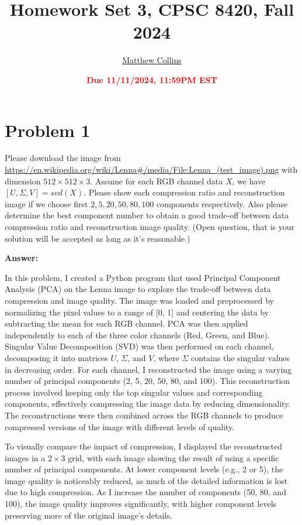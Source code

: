 \documentclass[11pt]{article}
\title{{\bf Homework Set 3, CPSC 8420, Fall 2024}} %
\author{\Large\underline{Matthew Collins}}
\date{\textbf{\Large\textcolor{red}{Due 11/11/2024, 11:59PM EST}}} %
\begin{document}
	\maketitle
	

\section*{Problem 1}
Please download the image from \url{https://en.wikipedia.org/wiki/Lenna#/media/File:Lenna_(test_image).png} with dimension $512\times512\times3$. Assume for each RGB channel data $X$, we have $[U,\Sigma,V]=svd(X)$. Please show each compression ratio and reconstruction image if we choose first $2, 5, 20, 50,80,100$ components respectively. Also please determine the best component number to obtain a good trade-off between data compression ratio and reconstruction image quality. (Open question, that is your solution will be accepted as long as it's reasonable.)


\textbf{Answer:}

In this problem, I created a Python program that used Principal Component Analysis (PCA) on the Lenna image to explore the trade-off between data compression and image quality. 
The image was loaded and preprocessed by normalizing the pixel values to a range of [0, 1] and centering the data by subtracting the mean for each RGB channel. 
PCA was then applied independently to each of the three color channels (Red, Green, and Blue). Singular Value Decomposition (SVD) was then performed on each channel, decomposing it into matrices \( U \), \( \Sigma \), and \( V \), 
where \( \Sigma \) contains the singular values in decreasing order. 
For each channel, I reconstructed the image using a varying number of principal components (2, 5, 20, 50, 80, and 100). 
This reconstruction process involved keeping only the top singular values and corresponding components, effectively compressing the image data by reducing dimensionality. 
The reconstructions were then combined across the RGB channels to produce compressed versions of the image with different levels of quality.

To visually compare the impact of compression, I displayed the reconstructed images in a \(2 \times 3\) grid, with each image showing the result of using a specific number of principal components. 
At lower component levels (e.g., 2 or 5), the image quality is noticeably reduced, as much of the detailed information is lost due to high compression. 
As I increase the number of components (50, 80, and 100), the image quality improves significantly, with higher component levels preserving more of the original image’s details. 
\end{document}

